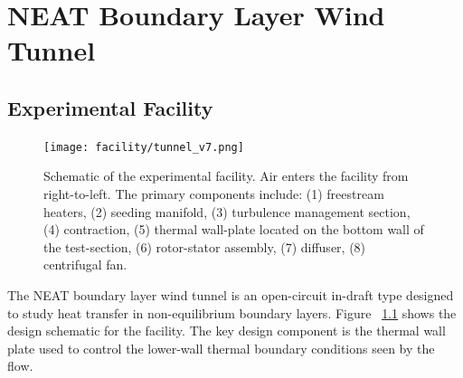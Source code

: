 \chapter{NEAT Boundary Layer Wind Tunnel}

\section{Experimental Facility}

\begin{figure}[h!]
\centering
\texttt{[image: facility/tunnel\_v7.png]}
\caption{Schematic of the experimental facility. Air enters the facility from right-to-left. The primary components include: (1) freestream heaters, 
(2) seeding manifold, (3) turbulence management section, (4) contraction, (5) thermal wall-plate located on the bottom wall of the test-section, (6) rotor-stator assembly, (7) diffuser, (8) centrifugal fan.}
\label{fig:tunnel}
\end{figure}

The NEAT boundary layer wind tunnel is an open-circuit in-draft type designed to study heat transfer in non-equilibrium boundary layers. Figure ~\ref{fig:tunnel} shows the design schematic for the facility. The key design component is the thermal wall plate used to control the lower-wall thermal boundary conditions seen by the flow. 

